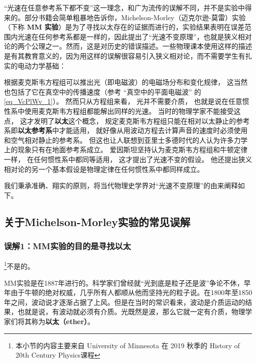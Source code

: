 

“光速在任意参考系下都不变”这一理念，和广为流传的误解不同，并不是实验中得来的。部分书籍会简单粗暴地告诉你，Michelson-Morley（迈克尔逊-莫雷）实验（下称 \textbf{MM 实验}）是为了寻找以太存在的证据而进行的，实验结果表明在误差范围内光速在任何参考系都是一样的，因此提出了“光速不变原理”，也就是狭义相对论的两个公理之一。然而，这是对历史的错误描述。一些物理课本使用这样的描述是有其教育意义的，因为用这样的误解很容易引入狭义相对论，而不需要学生有扎实的电动力学基础：

根据麦克斯韦方程组可以推出光（即电磁波）的电磁场分布和变化规律， 这当然也包括了它在真空中的传播速度（参考 “真空中的平面电磁波” 的 \autoref{eq_VcPlWv_1}）。 然而只从方程组来看， 光并不需要介质， 也就是说在任意惯性系中使用麦克斯韦方程组都能解出同样的光速。 当时的物理学家不能接受这点， 这才发明了\textbf{以太}这个概念， 规定麦克斯韦方程组只能在相对以太静止的参考系即\textbf{以太参考系}中才能适用， 就好像从用波动方程去计算声音的速度时必须使用和空气相对静止的参考系。 但这也让人联想到亚里士多德时代的人认为许多力学上的现象只有在地面参考系成立。 爱因斯坦坚持认为麦克斯韦方程组和牛顿定律一样， 在任何惯性系中都同等适用， 这才提出了光速不变的假设。 他还提出狭义相对论的另一个基本假设是物理定律在任何惯性系中都同样成立。

我们秉承准确、翔实的原则，将当代物理史学界对“光速不变原理”的由来阐释如下。

\subsection{关于Michelson-Morley实验的常见误解}

\subsubsection{误解1：MM实验的目的是寻找以太}

\footnote{本小节的内容主要来自 University of Minnesota 在 2019 秋季的 History of 20th Century Physics课程}不是的。

MM实验是在1887年进行的。科学家们曾经就“光到底是粒子还是波”争论不休，早年由于牛顿的绝对权威，几乎所有人都顺从他而坚持光的粒子说。在1800年至1850年之间，波动说才逐渐占据了上风。但是在当时的常识看来，波动是介质运动的结果，也就是说，有波动就必须有介质。光既然是波，那么它就一定有介质，物理学家们将其称为\textbf{以太（ether）}。

